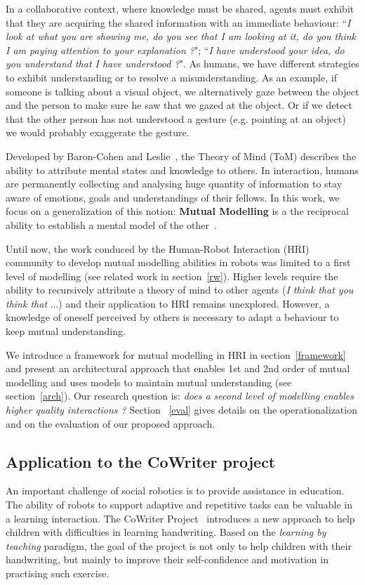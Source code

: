 \documentclass[10pt,a4paper]{article}
\begin{document}
In a collaborative context, where knowledge must be shared, agents must exhibit that they are acquiring the shared information with an immediate behaviour: ``\textit{I look at what you are showing me, do you see that I am looking at it, do you think I am paying attention to your explanation ?}"; ``\textit{I have understood your idea, do you understand that I have understood ?}". 
As humans, we have different strategies to exhibit understanding or to resolve a misunderstanding. 
As an example, if someone is talking about a visual object, we alternatively gaze between the object and the person to make sure he saw that we gazed at the object. Or if we detect that the other person has not understood a gesture (e.g. pointing at an object) we would probably exaggerate the gesture.

Developed by Baron-Cohen and Leslie~\cite{baron1985does}, the Theory of Mind (ToM) describes the ability to attribute mental states and knowledge to others. In interaction, humans are permanently collecting and analysing huge quantity of information to stay aware of emotions, goals and understandings of their fellows. In this work, we focus on a generalization of this notion: \textbf{Mutual Modelling} is a the reciprocal ability to establish a mental model of the other~\cite{lemaignan2015mutual}. %

Until now, the work conduced by the Human-Robot Interaction (HRI) community to develop mutual modelling abilities in robots was limited to a first level of modelling (see related work in section~\ref{rw}). Higher levels require the ability to recursively attribute a theory of mind to other agents (\textit{I think that you think that} ...) and their application to HRI remains unexplored. However, a knowledge of oneself perceived by others is necessary to adapt a behaviour to keep mutual understanding. 

We introduce a framework for mutual modelling in HRI in section~\ref{framework} and present an  architectural approach that enables 1st and 2nd order of mutual modelling and uses models to maintain mutual understanding (see section~\ref{arch}).
Our research question is: \textit{does a second level of modelling enables higher quality interactions ?} 
Section ~\ref{eval} gives details on the operationalization and on the evaluation of our proposed approach.

\subsection{Application to the CoWriter project}
An important challenge of social robotics is to provide assistance in education. 
The ability of robots to support adaptive and repetitive tasks can be valuable in a learning interaction.
The CoWriter Project~\cite{Hood,jacq2016building} introduces a new approach to help children with difficulties in learning handwriting. 
Based on the \emph{learning by teaching} paradigm, the goal of the project is not only to help children with their handwriting, but mainly to improve their self-confidence and motivation in practising such exercise.
\end{document}
